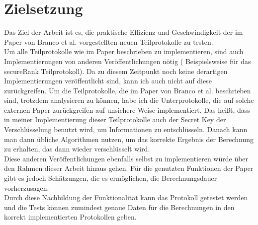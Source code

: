 \section{Zielsetzung}
Das Ziel der Arbeit ist es, die praktische Effizienz und Geschwindigkeit der im Paper von Branco et al. \cite{Doettling2021} vorgestellten neuen Teilprotokolle zu testen. \\
Um alle Teilprotokolle wie im Paper beschrieben zu implementieren, sind auch Implementierungen von anderen Veröffentlichungen nötig (\cite{Schoenmakers} Beispielsweise für das secureRank Teilprotokoll). Da zu diesem Zeitpunkt noch keine derartigen Implementierungen veröffentlicht sind, kann ich auch nicht auf diese zurückgreifen. Um die Teilprotokolle, die im Paper von Branco et al. \cite{Doettling2021} beschrieben sind, trotzdem analysieren zu können, habe ich die Unterprotokolle, die auf solche externen Paper zurückgreifen auf unsichere Weise implementiert. Das heißt, dass in meiner Implementierung dieser Teilprotokolle auch der Secret Key der Verschlüsselung benutzt wird, um Informationen zu entschlüsseln. Danach kann man dann übliche Algorithmen nutzen, um das korrekte Ergebnis der Berechnung zu erhalten, das dann wieder verschlüsselt wird.\\
Diese anderen Veröffentlichungen ebenfalls selbst zu implementieren würde über den Rahmen dieser Arbeit hinaus gehen. Für die genutzten Funktionen der Paper gibt es jedoch Schätzungen, die es ermöglichen, die Berechnungsdauer vorherzusagen.\\
Durch diese Nachbildung der Funktionalität kann das Protokoll getestet werden und die Tests können zumindest genaue Daten für die Berechnungen in den korrekt implementierten Protokollen geben.
